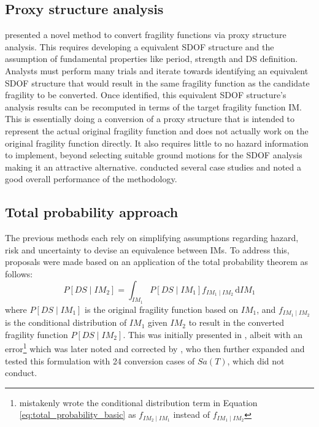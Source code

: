 \subsection{Proxy structure analysis}
\citet{KaraferisVamvatsikos2022} presented a novel method to convert fragility functions via proxy structure analysis. This requires developing a equivalent \ac{SDOF} structure and the assumption of fundamental properties like period, strength and \ac{DS} definition. Analysts must perform many trials and iterate towards identifying an equivalent \ac{SDOF} structure that would result in the same fragility function as the candidate fragility to be converted. Once identified, this equivalent \ac{SDOF} structure's analysis results can be recomputed in terms of the target fragility function \ac{IM}. This is essentially doing a conversion of a proxy structure that is intended to represent the actual original fragility function and does not actually work on the original fragility function directly. It also requires little to no hazard information to implement, beyond selecting suitable ground motions for the \ac{SDOF} analysis making it an attractive alternative. \citet{KaraferisVamvatsikos2022} conducted several case studies and noted a good overall performance of the methodology. 


\subsection{Total probability approach}\label{sec:total-probabaility}
The previous methods each rely on simplifying assumptions regarding hazard, risk and uncertainty to devise an equivalence between \acp{IM}. To address this, proposals were made based on an application of the total probability theorem as follows:
\begin{equation}
    \label{eq:total_probability_basic}
    P[DS \mid IM_2] = \int_{IM_1} P[DS \mid IM_1] f_{IM_1 \mid IM_2} \, \mathrm{d}IM_1
\end{equation}
where $P[DS \mid IM_1]$ is the original fragility function based on $IM_1$, and $f_{IM_1 \mid  IM_2}$ is the conditional distribution of $IM_1$ given $IM_2$ to result in the converted fragility function $P[DS \mid IM_2]$. This was initially presented in \citet{Michel2018}, albeit with an error\footnote{\citet{Michel2018} mistakenly wrote the conditional distribution term in Equation \eqref{eq:total_probability_basic} as $f_{IM_2 \mid IM_1}$ instead of $f_{IM_1 \mid IM_2 }$} which was later noted and corrected by \citet{Suzuki2020}, who then further expanded and tested this formulation with 24 conversion cases of $Sa(T)$, which \citet{Michel2018} did not conduct. 

